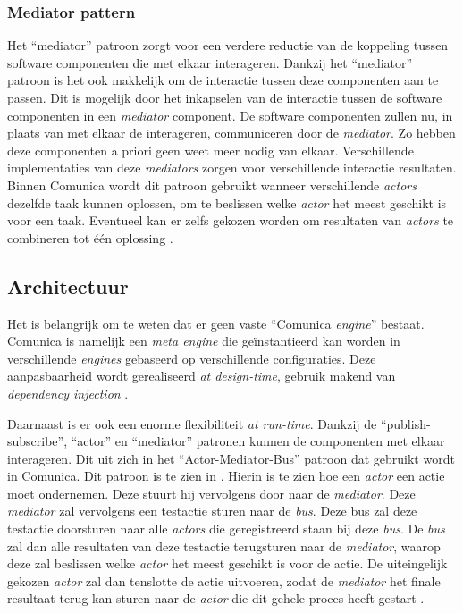 \subsubsection{Mediator pattern}
Het ``mediator'' patroon zorgt voor een verdere reductie van de koppeling tussen software componenten die met elkaar interageren. Dankzij het ``mediator'' patroon is het ook makkelijk om de interactie tussen deze componenten aan te passen. Dit is mogelijk door het inkapselen van de interactie tussen de software componenten in een \textit{mediator} component. De software componenten zullen nu, in plaats van met elkaar de interageren, communiceren door de \textit{mediator}. Zo hebben deze componenten a priori geen weet meer nodig van elkaar. Verschillende implementaties van deze \textit{mediators} zorgen voor verschillende interactie resultaten. Binnen Comunica wordt dit patroon gebruikt wanneer verschillende \textit{actors} dezelfde taak kunnen oplossen, om te beslissen welke \textit{actor} het meest geschikt is voor een taak. Eventueel kan er zelfs gekozen worden om resultaten van \textit{actors} te combineren tot één oplossing \cite{taelman2018comunica}.


\subsection{Architectuur}
Het is belangrijk om te weten dat er geen vaste ``Comunica \textit{engine}'' bestaat. Comunica is namelijk een \textit{meta engine} die geïnstantieerd kan worden in verschillende \textit{engines} gebaseerd op verschillende configuraties. Deze aanpasbaarheid wordt gerealiseerd \textit{at design-time}, gebruik makend van \textit{dependency injection} \cite{taelman2018comunica}. 

Daarnaast is er ook een enorme flexibiliteit \textit{at run-time}. Dankzij de ``publish-subscribe'', ``actor'' en ``mediator'' patronen kunnen de componenten met elkaar interageren. Dit uit zich in het ``Actor-Mediator-Bus'' patroon dat gebruikt wordt in Comunica. Dit patroon is te zien in . Hierin is te zien hoe een \textit{actor} een actie moet ondernemen. Deze stuurt hij vervolgens door naar de \textit{mediator}. Deze \textit{mediator} zal vervolgens een testactie sturen naar de \textit{bus}. Deze bus zal deze testactie doorsturen naar alle \textit{actors} die geregistreerd staan bij deze \textit{bus}. De \textit{bus} zal dan alle resultaten van deze testactie terugsturen naar de \textit{mediator}, waarop deze zal beslissen welke \textit{actor} het meest geschikt is voor de actie. De uiteingelijk gekozen \textit{actor} zal dan tenslotte de actie uitvoeren, zodat de \textit{mediator} het finale resultaat terug kan sturen naar de \textit{actor} die dit gehele proces heeft gestart \cite{taelman2018comunica}.


